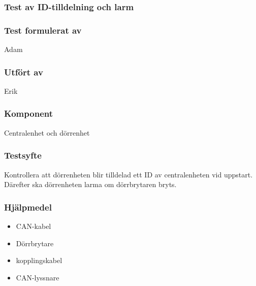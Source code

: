\clearpage
\subsubsection{Test av ID-tilldelning och larm}
\label{test:idLarm}

\setlength{\columnsep}{1cm}




\begin{multicols}{2}
\subsubsection*{Test formulerat av}
Adam

\subsubsection*{Utfört av}
Erik


\end{multicols}
\subsubsection*{Komponent}
Centralenhet och dörrenhet



\subsubsection*{Testsyfte}
Kontrollera att dörrenheten blir tilldelad ett ID av centralenheten vid uppstart. Därefter ska dörrenheten larma om dörrbrytaren bryts.


\subsubsection*{Hjälpmedel}
\begin{itemize}
	\item CAN-kabel
	\item Dörrbrytare
	\item kopplingskabel
	\item CAN-lyssnare
\end{itemize}



